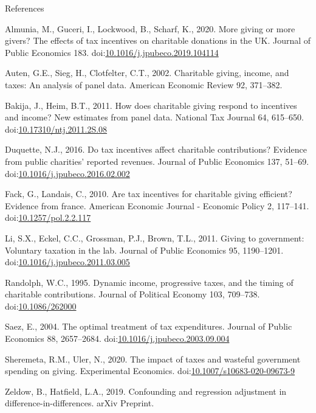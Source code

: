 \documentclass[
  ignorenonframetext,
]{beamer}
\newlength{\cslhangindent}
\newenvironment{CSLReferences}[2] %
 {%
  \setlength{\parindent}{0pt}
  \ifodd #1 \everypar{\setlength{\hangindent}{\cslhangindent}}\ignorespaces\fi
  \ifnum #2 > 0
  \setlength{\parskip}{#2\baselineskip}
  \fi
 }%
 {}
\begin{document}
\begin{frame}[allowframebreaks]{References}
\hypertarget{refs}{}
\begin{CSLReferences}{1}{0}
\leavevmode{}%
Almunia, M., Guceri, I., Lockwood, B., Scharf, K., 2020. More giving or more givers? The effects of tax incentives on charitable donations in the UK. Journal of Public Economics 183. doi:\href{https://doi.org/10.1016/j.jpubeco.2019.104114}{10.1016/j.jpubeco.2019.104114}

\leavevmode{}%
Auten, G.E., Sieg, H., Clotfelter, C.T., 2002. Charitable giving, income, and taxes: An analysis of panel data. American Economic Review 92, 371--382.

\leavevmode{}%
Bakija, J., Heim, B.T., 2011. How does charitable giving respond to incentives and income? New estimates from panel data. National Tax Journal 64, 615--650. doi:\href{https://doi.org/10.17310/ntj.2011.2S.08}{10.17310/ntj.2011.2S.08}

\leavevmode{}%
Duquette, N.J., 2016. Do tax incentives affect charitable contributions? Evidence from public charities' reported revenues. Journal of Public Economics 137, 51--69. doi:\href{https://doi.org/10.1016/j.jpubeco.2016.02.002}{10.1016/j.jpubeco.2016.02.002}

\leavevmode{}%
Fack, G., Landais, C., 2010. Are tax incentives for charitable giving efficient? Evidence from france. American Economic Journal - Economic Policy 2, 117--141. doi:\href{https://doi.org/10.1257/pol.2.2.117}{10.1257/pol.2.2.117}

\leavevmode{}%
Li, S.X., Eckel, C.C., Grossman, P.J., Brown, T.L., 2011. Giving to government: Voluntary taxation in the lab. Journal of Public Economics 95, 1190--1201. doi:\href{https://doi.org/10.1016/j.jpubeco.2011.03.005}{10.1016/j.jpubeco.2011.03.005}

\leavevmode{}%
Randolph, W.C., 1995. Dynamic income, progressive taxes, and the timing of charitable contributions. Journal of Political Economy 103, 709--738. doi:\href{https://doi.org/10.1086/262000}{10.1086/262000}

\leavevmode{}%
Saez, E., 2004. The optimal treatment of tax expenditures. Journal of Public Economics 88, 2657--2684. doi:\href{https://doi.org/10.1016/j.jpubeco.2003.09.004}{10.1016/j.jpubeco.2003.09.004}

\leavevmode{}%
Sheremeta, R.M., Uler, N., 2020. The impact of taxes and wasteful government spending on giving. Experimental Economics. doi:\href{https://doi.org/10.1007/s10683-020-09673-9}{10.1007/s10683-020-09673-9}

\leavevmode{}%
Zeldow, B., Hatfield, L.A., 2019. Confounding and regression adjustment in difference-in-differences. arXiv Preprint.

\end{CSLReferences}
\end{frame}
\end{document}
